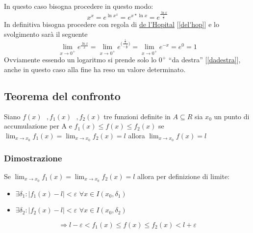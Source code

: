 \begin{description}
		In questo caso bisogna procedere in questo modo:
		\begin{equation*}
			x^x=e^{\ln{x^x}}=e^{{x*\ln x}}=e^\frac{\ln x}{\frac{1}{x}}
		\end{equation*}
		In definitiva bisogna procedere con regola di \underline{de l'Hopital} [\ref{del'hop}] e lo svolgimento sarà il seguente
		\begin{equation*}
			\lim_{x\to 0^+}e^\frac{\ln x}{x}=\lim_{x\to 0^+}e^{\bigg(\frac{\frac{1}{x}}{-\frac{1}{x}}\bigg)}=\lim_{x\to 0^+}e^{-x}=e^0=1
		\end{equation*}
		Ovviamente essendo un logaritmo si prende solo lo $0^+$ ``da destra'' [\ref{dadestra}], anche in questo caso alla fine ha reso un valore determinato.
\end{description}
\subsection{Teorema del confronto}
Siano $f(x)\text{ },f_1(x)\text{ },f_2(x)$ tre funzioni definite in $A\subseteq R$ sia $x_0$ un
punto di accumulazione per A e $f_1(x)\leq f(x) \leq f_2(x)$ se $\lim_{x\to
x_0}f_1(x)=\lim_{x\to x_0} f_2(x)=l$ allora $\lim_{x\to x_0} f(x)=l$
\subsubsection{Dimostrazione}
Se $\lim_{x\to x_0} f_1(x)=\lim_{x\to x_0} f_2(x)=l$ allora per definizione di
limite:
\begin{itemize}
	\item $\exists \delta_1:|f_1(x)-l|<\varepsilon$ $\forall x \in I(x_0,\delta_1)$
	\item $\exists \delta_2:|f_2(x)-l|<\varepsilon$ $\forall x \in
		I(x_0,\delta_2)$
\end{itemize}
\begin{equation*}
	\Rightarrow l-\varepsilon < f_1(x) \leq f(x)\leq f_2(x) < l+ \varepsilon
\end{equation*}

